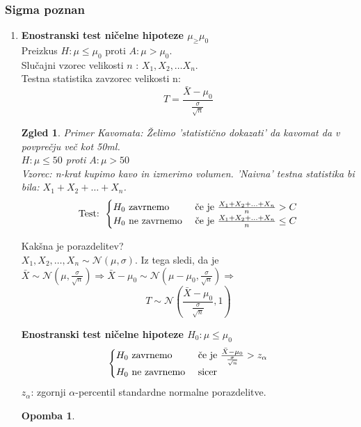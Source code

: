 \documentclass[11pt]{article}
\newtheorem{Zgled}[Izrek]{{\sc Zgled}}
\newtheorem{Opomba}[Izrek]{{\sc Opomba}}
\begin{document}
	\subsubsection{Sigma poznan}
		\begin{enumerate}
			\item \textbf{Enostranski test ničelne hipoteze $\mu_ \ge \mu_0$}
			\\
			Preizkus $H: \mu \le \mu_0$ proti $A:\mu > \mu_0$.
			\\
			Slučajni vzorec velikosti $n$ : $X_1, X_2, \ldots X_n$.
			\\
			Testna statistika zavzorec velikosti n: $$T= \frac{\bar{X} - \mu_0}{\frac{\sigma}{\sqrt{n}}}$$
			\begin{Zgled}
				Primer Kavomata: Želimo 'statistično dokazati' da kavomat da v povprečju več kot 50ml.
				\\
				$H:\mu \le 50$ proti $A: \mu > 50$
				\\
				Vzorec: n-krat kupimo kavo in izmerimo volumen.
				'Naivna' testna statistika bi bila: $X_1 + X_2 + \ldots + X_n$.
				\\
				\[
				\textnormal{Test: }
				\begin{cases}
				H_0 \textnormal{ zavrnemo } & \textnormal{če je } \frac{X_1 + X_2 + \ldots + X_n}{n} > C\\
				H_0 \textnormal{ ne zavrnemo } & \textnormal{če je } \frac{X_1 + X_2 + \ldots + X_n}{n} \le C
				\end{cases}
				\]
			\end{Zgled}
			Kakšna je porazdelitev?
			\\
			$X_1, X_2, \ldots ,X_n \sim \mathcal{N}(\mu,\sigma) $. 
			Iz tega sledi, da je $\bar{X}\sim\mathcal{N}(\mu, \frac{\sigma}{\sqrt{n}}) \Rightarrow \bar{X} -\mu_0 \sim \mathcal{N}(\mu - \mu_0, \frac{\sigma}{\sqrt{n}}) \Rightarrow$
			$$T\sim \mathcal{N}\left(\frac{\bar{X}- \mu_0}{\frac{\sigma}{\sqrt{n}}}, 1\right)$$
			\begin{framed}
				\textbf{Enostranski test ničelne hipoteze $H_0: \mu\le \mu_0$}
			\[
			\begin{cases}
			H_0 \textnormal{ zavrnemo } & \textnormal{če je } \frac{\bar{X}- \mu_0}{\frac{\sigma}{\sqrt{n}}} > z_\alpha\\
			H_0 \textnormal{ ne zavrnemo } & \textnormal{sicer } 
			\end{cases}
			\]
			$z_\alpha$: zgornji $\alpha$-percentil standardne normalne porazdelitve.
			\end{framed}
		\begin{Opomba}

\end{Opomba}
\end{enumerate}
\end{document}
